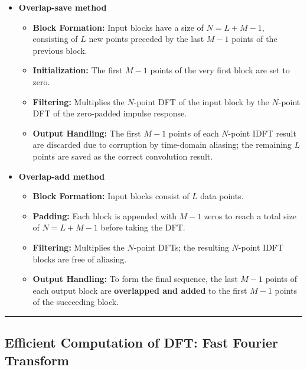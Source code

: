 \begin{itemize}
\item
  \textbf{Overlap-save method}

  \begin{itemize}
  \tightlist
  \item
    \textbf{Block Formation:} Input blocks have a size of
    \(N = L + M - 1\), consisting of \(L\) new points preceded by the
    last \(M - 1\) points of the previous block.
  \item
    \textbf{Initialization:} The first \(M - 1\) points of the very
    first block are set to zero.
  \item
    \textbf{Filtering:} Multiplies the \(N\)-point DFT of the input
    block by the \(N\)-point DFT of the zero-padded impulse response.
  \item
    \textbf{Output Handling:} The first \(M - 1\) points of each
    \(N\)-point IDFT result are discarded due to corruption by
    time-domain aliasing; the remaining \(L\) points are saved as the
    correct convolution result.
  \end{itemize}
\item
  \textbf{Overlap-add method}

  \begin{itemize}
  \tightlist
  \item
    \textbf{Block Formation:} Input blocks consist of \(L\) data points.
  \item
    \textbf{Padding:} Each block is appended with \(M - 1\) zeros to
    reach a total size of \(N = L + M - 1\) before taking the DFT.
  \item
    \textbf{Filtering:} Multiplies the \(N\)-point DFTs; the resulting
    \(N\)-point IDFT blocks are free of aliasing.
  \item
    \textbf{Output Handling:} To form the final sequence, the last
    \(M - 1\) points of each output block are \textbf{overlapped and
    added} to the first \(M - 1\) points of the succeeding block.
  \end{itemize}
\end{itemize}

\begin{center}\rule{0.5\linewidth}{0.5pt}\end{center}

\hypertarget{efficient-computation-of-dft-fast-fourier-transform}{%
\subsection{Efficient Computation of DFT: Fast Fourier
Transform}\label{efficient-computation-of-dft-fast-fourier-transform}}

